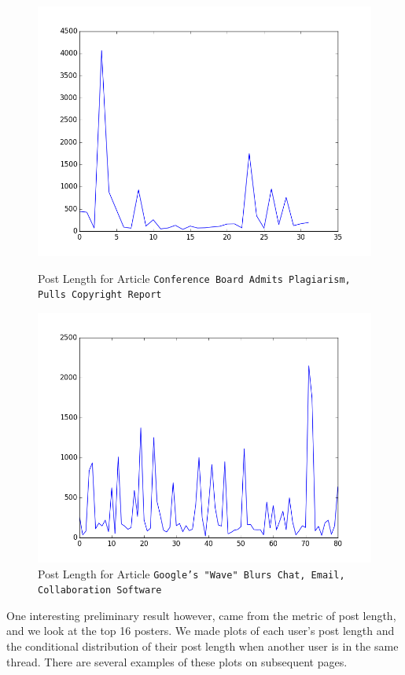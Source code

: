 \documentclass[a4paper,12pt]{article}
\numberwithin{equation}{section}
\begin{document}
\begin{figure}[h!]
\begin{center}
\includegraphics[scale=0.50]{CL_conferencePlagiarism.png}
\caption{Post Length for Article {\tt Conference Board Admits Plagiarism, Pulls Copyright Report}}

\includegraphics[scale=0.50]{CL_GooglesWave.png}
\caption{Post Length for Article {\tt Google's "Wave" Blurs Chat, Email, Collaboration Software}}
\end{center}
\end{figure}





One interesting preliminary result however, came from the metric of post length, and we look at the top 16 posters. We made plots of each user's post length and the conditional distribution of their post length when another user is in the same thread. There are several examples of these plots on subsequent pages.
\end{document}
